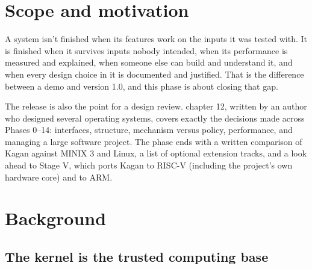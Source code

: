\documentclass[11pt,a4paper]{article}
\begin{document}


\section{Scope and motivation}

A system isn't finished when its features work on the inputs it was tested with. It is finished when it survives inputs
nobody intended, when its performance is measured and explained, when someone else can build and understand it, and when
every design choice in it is documented and justified. That is the difference between a demo and version 1.0, and this phase is about
closing that gap.

The release is also the point for a design review. \MOS chapter 12, written by an author who designed several operating
systems, covers exactly the decisions made across Phases 0--14: interfaces, structure, mechanism versus policy,
performance, and managing a large software project. The phase ends with a written comparison of Kagan against
MINIX 3 and Linux, a list of optional extension tracks, and a look ahead to Stage V, which ports Kagan to RISC-V
(including the project's own hardware core) and to ARM.

\section{Background}

\subsection{The kernel is the trusted computing base}
\end{document}
